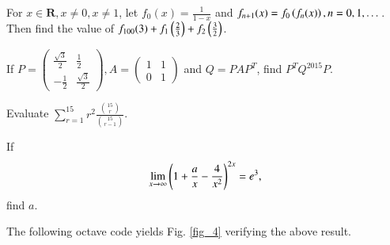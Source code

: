 \documentclass[journal,12pt,twocolumn]{IEEEtran}
\begin{document}
%
\IEEEpeerreviewmaketitle

\begin{problem}
For $x \in \mathbf{R}, x \neq 0, x \neq 1$, let $f_0(x) = \frac{1}{1-x}$ 
and $f_{n+1}(x) = f_0\left(f_n(x)\right), n = 0, 1, \dots $.  Then find the value of
$f_{100}(3) + f_1\left(\frac{2}{3}\right)+f_2\left(\frac{3}{2}\right)$.
\end{problem}
%
\solution


%
\begin{problem}
If $P = 
\begin{pmatrix}
\frac{\sqrt{3}}{2} & \frac{1}{2} \\
-\frac{1}{2} & \frac{\sqrt{3}}{2}
\end{pmatrix}, A = 
\begin{pmatrix}
1 & 1 \\
0 & 1
\end{pmatrix}
$ and $Q = P A P^{T}$, find $P^{T}Q^{2015} P$.
\end{problem}
\solution


\begin{problem}
Evaluate $\sum_{r=1}^{15}r^2 \frac{\binom{15}{r}}{\binom{15}{r-1}}$.
\end{problem}
\solution


\begin{problem}
If 
\begin{align}
\label{prob_four}
\lim_{x \rightarrow \infty} \left(1 + \frac{a}{x} - \frac{4}{x^2}\right)^{2x} = e^3,
\end{align}
 find $a$.
\end{problem}
\solution 

The following octave code yields Fig. \ref{fig_4} verifying the above result.

\end{document}
